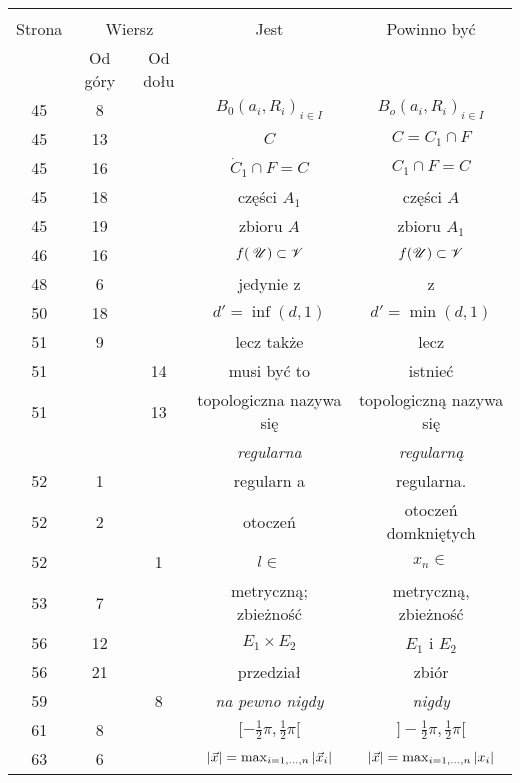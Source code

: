 \documentclass[a4paper,11pt]{article}
\begin{document}
\begin{center}

  \begin{tabular}{|c|c|c|c|c|}
    \hline
    & \multicolumn{2}{c|}{} & & \\
    Strona & \multicolumn{2}{c|}{Wiersz} & Jest
                              & Powinno być \\ \cline{2-3}
    & Od góry & Od dołu & & \\
    \hline
    45  &  8 & & $B_{ 0 }( a_{ i }, R_{ i } )_{ i \in I }$
           & $B_{ o }( a_{ i }, R_{ i } )_{ i \in I }$ \\
    45  & 13 & & $C$ & $C = C_{ 1 } \cap F$ \\
    45  & 16 & & $\dot{ C }_{ 1 } \cap F = C$ & $C_{ 1 } \cap F = C$ \\
    45  & 18 & & części $A_{ 1 }$ & części $A$ \\
    45  & 19 & & zbioru $A$ & zbioru $A_{ 1 }$ \\
    46  & 16 & & $f( \: \mathcal{U} ) \subset \mathcal{V}$ & $f( \mathcal{U} ) \subset \mathcal{V}$ \\
    48  &  6 & & jedynie z & z \\
    50  & 18 & & $d' = \inf( d, 1 )$ & $d' = \min( d, 1 )$ \\
    51  &  9 & & lecz także & lecz \\
    51  & & 14 & musi być to & istnieć \\
    51  & & 13 & topologiczna nazywa się & topologiczną nazywa się \\
    & & & \textit{regularna} & \textit{regularną} \\  %
    52  &  1 & & regularn a & regularna. \\
    52  &  2 & & otoczeń & otoczeń domkniętych \\
    52  & &  1 & $l \in$ & $x_{ n } \in$ \\
    53  &  7 & & metryczną; zbieżność & metryczną, zbieżność \\
    56  & 12 & & $E_{ 1 } \times E_{ 2 }$ & $E_{ 1 }$ i $E_{ 2 }$ \\
    56  & 21 & & przedział & zbiór \\
    59  & &  8 & \textit{na pewno nigdy} & \textit{nigdy} \\
    61  &  8 & & $[ -\frac{ 1 }{ 2 } \pi, \frac{ 1 }{ 2 } \pi [$
           & $] -\frac{ 1 }{ 2 } \pi, \frac{ 1 }{ 2 } \pi [$ \\
    63  &  6 & & $| \vec{ x } | = \max_{ i = 1, \ldots, n} | \vec{ x }_{ i } |$
           & $| \vec{ x } | = \max_{ i = 1, \ldots, n} | x_{ i } |$ \\

\end{tabular}
\end{center}
\end{document}
